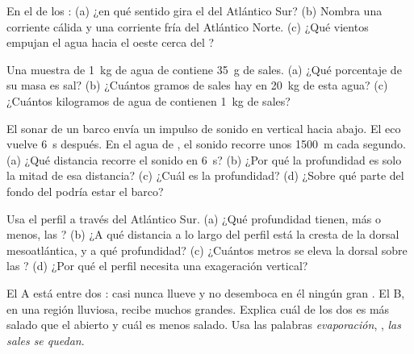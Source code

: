 \begin{exercise}[$\star$]\label{exo:g8:the-oceans:4}
En el  de los : (a) ¿en qué sentido gira el  del Atlántico
Sur? (b) Nombra una corriente cálida y una corriente fría del Atlántico
Norte. (c) ¿Qué vientos empujan el agua hacia el oeste cerca del ?
\end{exercise}

\begin{exercise}[$\star\star$]\label{exo:g8:the-oceans:5}
Una muestra de \qty{1}{kg} de agua de  contiene \qty{35}{g} de sales.
(a) ¿Qué porcentaje de su masa es sal? (b) ¿Cuántos gramos de sales hay en
\qty{20}{kg} de esta agua? (c) ¿Cuántos kilogramos de agua de  contienen
\qty{1}{kg} de sales?
\end{exercise}

\begin{exercise}[$\star\star$]\label{exo:g8:the-oceans:6}
El sonar de un barco envía un impulso de sonido en vertical hacia abajo. El
eco vuelve \qty{6}{s} después. En el agua de , el sonido recorre unos
\qty{1500}{m} cada segundo. (a) ¿Qué distancia recorre el sonido en
\qty{6}{s}? (b) ¿Por qué la profundidad es solo la mitad de esa distancia?
(c) ¿Cuál es la profundidad? (d) ¿Sobre qué parte del fondo del 
podría estar el barco?
\end{exercise}

\begin{exercise}[$\star\star$]\label{exo:g8:the-oceans:7}
Usa el perfil a través del Atlántico Sur. (a) ¿Qué profundidad tienen, más
o menos, las ? (b) ¿A qué distancia a lo largo del perfil
está la cresta de la dorsal mesoatlántica, y a qué profundidad? (c) ¿Cuántos
metros se eleva la dorsal sobre las ? (d) ¿Por qué el perfil
necesita una exageración vertical?
\end{exercise}

\begin{exercise}[$\star\star$]\label{exo:g8:the-oceans:8}
El  A está entre dos : casi nunca llueve y no desemboca en él
ningún gran . El  B, en una región lluviosa, recibe muchos 
grandes. Explica cuál de los dos es más salado que el  abierto y cuál
es menos salado. Usa las palabras \emph{evaporación}, \emph{},
\emph{las sales se quedan}.
\end{exercise}

